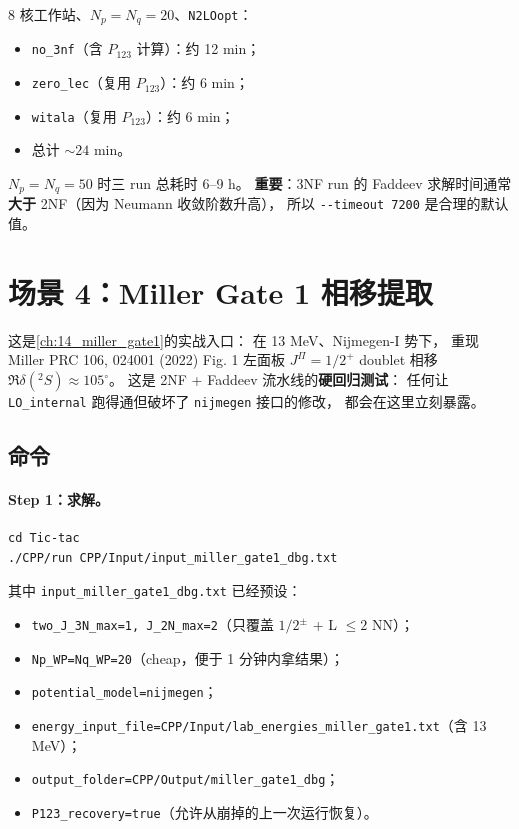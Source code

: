 8 核工作站、$N_p = N_q = 20$、\texttt{N2LOopt}：
\begin{itemize}
  \item \texttt{no\_3nf}（含 $P_{123}$ 计算）：约 12 min；
  \item \texttt{zero\_lec}（复用 $P_{123}$）：约 6 min；
  \item \texttt{witala}（复用 $P_{123}$）：约 6 min；
  \item 总计 $\sim 24$ min。
\end{itemize}
$N_p = N_q = 50$ 时三 run 总耗时 6--9 h。
\textbf{重要}：3NF run 的 Faddeev 求解时间通常\textbf{大于} 2NF（因为 Neumann 收敛阶数升高），
所以 \texttt{-{}-timeout 7200} 是合理的默认值。

\section{场景 4：Miller Gate 1 相移提取}
\label{sec:ch20-scenario-miller}

这是\cref{ch:14_miller_gate1}的实战入口：
在 13 MeV、Nijmegen-I 势下，
重现 Miller PRC 106, 024001 (2022) Fig. 1 左面板
$J^\Pi = 1/2^+$ doublet 相移 $\Re\delta(^2S) \approx 105^\circ$。
这是 2NF + Faddeev 流水线的\textbf{硬回归测试}：
任何让 \texttt{LO\_internal} 跑得通但破坏了 \texttt{nijmegen} 接口的修改，
都会在这里立刻暴露。

\subsection{命令}
\label{sec:ch20-s4-cmd}

\paragraph{Step 1：求解。}
\begin{lstlisting}[style=config,caption={Miller Gate 1 在 13 MeV 上的 2NF-only 求解（Nijmegen-I 势）。}]
cd Tic-tac
./CPP/run CPP/Input/input_miller_gate1_dbg.txt
\end{lstlisting}
其中 \texttt{input\_miller\_gate1\_dbg.txt} 已经预设：
\begin{itemize}
  \item \texttt{two\_J\_3N\_max=1, J\_2N\_max=2}（只覆盖 $1/2^\pm$ + L $\le 2$ NN）；
  \item \texttt{Np\_WP=Nq\_WP=20}（cheap，便于 1 分钟内拿结果）；
  \item \texttt{potential\_model=nijmegen}；
  \item \texttt{energy\_input\_file=CPP/Input/lab\_energies\_miller\_gate1.txt}（含 13 MeV）；
  \item \texttt{output\_folder=CPP/Output/miller\_gate1\_dbg}；
  \item \texttt{P123\_recovery=true}（允许从崩掉的上一次运行恢复）。
\end{itemize}

